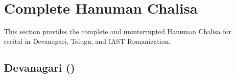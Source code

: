 
\section*{Complete Hanuman Chalisa}

This section provides the complete and uninterrupted Hanuman Chalisa for recital in Devanagari, Telugu, and IAST Romanization.

\subsection*{Devanagari ()}

